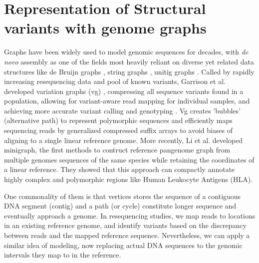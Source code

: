 \documentclass[phd,tocprelim]{cornell}
\begin{document}
\section{Representation of Structural variants with genome graphs}
Graphs have been widely used to model genomic sequences for decades, with \textit{de novo} assembly as one of the fields most heavily reliant on diverse yet related data structures like de Bruijn graphs \cite{Zerbino2008-cc}, string graphs \cite{Simpson2010-xe}, unitig graphs \cite{Li2012-ac}. Called by rapidly increasing resequencing data and pool of known variants, Garrison et al. developed variation graphs (vg) \cite{Garrison2018-sj}, compressing all sequence variants found in a population, allowing for variant-aware read mapping for individual samples, and achieving more accurate variant calling and genotyping \cite{Hickey2020-cu,Siren2020-tf}. Vg creates 'bubbles' (alternative path) to represent polymorphic sequences and efficiently maps sequencing reads by generalized compressed suffix arrays to avoid biases of aligning to a single linear reference genome. More recently, Li et al. \cite{Li2020-ai} developed minigraph, the first methods to contruct reference pangenome graph from multiple genomes sequences of the same species while retaining the coordinates of a linear reference. They showed that this approach can compactly annotate highly complex and polymorphic regions like Human Leukocyte Antigens (HLA).


One commonality of them is that vertices stores the sequence of a contiguous DNA segment (contig) and a path (or cycle) constitute longer sequence and eventually approach a genome. In resequencing studies, we map reads to locations in an existing reference genome, and identify variants based on the discrepancy between reads and the mapped reference sequence. Nevertheless, we can apply a similar idea of modeling, now replacing actual DNA sequences to the genomic intervals they map to in the reference.
\end{document}
